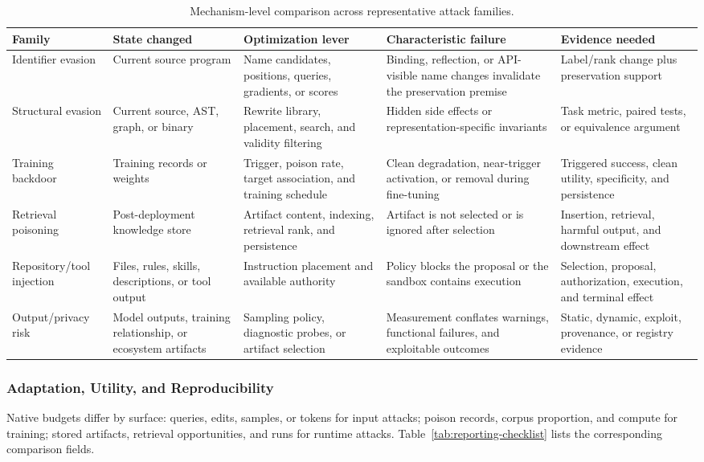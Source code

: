 \documentclass[acmsmall,screen,review,nonacm]{acmart}
\begin{document}
\begin{table}[t]
\centering
\small
\caption{Mechanism-level comparison across representative attack families.}
\label{tab:mechanisms}
\begin{tabularx}{\textwidth}{@{}L{2.55cm}L{2.35cm}L{2.85cm}L{2.85cm}Y@{}}
\toprule
\textbf{Family} & \textbf{State changed} & \textbf{Optimization lever} & \textbf{Characteristic failure} & \textbf{Evidence needed} \\
\midrule
Identifier evasion & Current source program & Name candidates, positions, queries, gradients, or scores & Binding, reflection, or API-visible name changes invalidate the preservation premise & Label/rank change plus preservation support \\
Structural evasion & Current source, AST, graph, or binary & Rewrite library, placement, search, and validity filtering & Hidden side effects or representation-specific invariants & Task metric, paired tests, or equivalence argument \\
Training backdoor & Training records or weights & Trigger, poison rate, target association, and training schedule & Clean degradation, near-trigger activation, or removal during fine-tuning & Triggered success, clean utility, specificity, and persistence \\
Retrieval poisoning & Post-deployment knowledge store & Artifact content, indexing, retrieval rank, and persistence & Artifact is not selected or is ignored after selection & Insertion, retrieval, harmful output, and downstream effect \\
Repository/tool injection & Files, rules, skills, descriptions, or tool output & Instruction placement and available authority & Policy blocks the proposal or the sandbox contains execution & Selection, proposal, authorization, execution, and terminal effect \\
Output/privacy risk & Model outputs, training relationship, or ecosystem artifacts & Sampling policy, diagnostic probes, or artifact selection & Measurement conflates warnings, functional failures, and exploitable outcomes & Static, dynamic, exploit, provenance, or registry evidence \\
\bottomrule
\end{tabularx}
\end{table}

\subsubsection{Adaptation, Utility, and Reproducibility}
Native budgets differ by surface: queries, edits, samples, or tokens for input attacks; poison records, corpus proportion, and compute for training; stored artifacts, retrieval opportunities, and runs for runtime attacks. Table~\ref{tab:reporting-checklist} lists the corresponding comparison fields.
\end{document}
